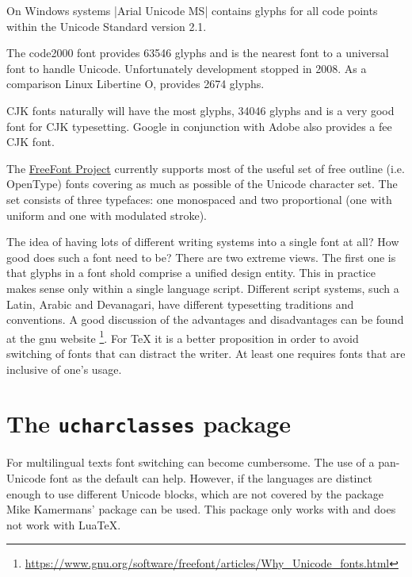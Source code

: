 On Windows systems |Arial Unicode MS| contains glyphs for all code points within the Unicode Standard version 2.1.  

The code2000 font provides 63546 glyphs and is the nearest font to a universal font to handle Unicode. Unfortunately development stopped in 2008. As a comparison Linux Libertine O, provides 2674 glyphs. \label{code2000}

CJK fonts naturally will have the most glyphs,  34046 glyphs and is a very good font for CJK typesetting. Google in conjunction with Adobe also provides a fee CJK font.

The \href{http://ftp.gnu.org/gnu/freefont/}{FreeFont Project} currently supports most of the useful set of free outline (i.e. OpenType) fonts covering as much as possible of the Unicode character set. The set consists of three typefaces: one monospaced and two proportional (one with uniform and one with modulated stroke). 

The idea of having lots of different writing systems into a single font at all? How good does such a font need to be?
There are two extreme views.  The first one is that glyphs in a font shold comprise a unified design entity. This in practice makes sense only within a single language script. Different script systems, such a Latin, Arabic and Devanagari, have different typesetting traditions and conventions.  A good discussion of the advantages and disadvantages can be found at the gnu website \footnote{\protect\url{https://www.gnu.org/software/freefont/articles/Why_Unicode_fonts.html}}. For TeX it is a better proposition in order to avoid switching of fonts that can distract the writer. At least one requires fonts that are inclusive of one's usage. 

\section{The \texttt{ucharclasses} package}

For multilingual texts font switching can become cumbersome. The use of a pan-Unicode font as the default can help. However, if the languages are distinct enough to use different Unicode blocks, which are not covered by the  package Mike Kamermans' package  can be used. This package only works with \xelatex and does not work with LuaTeX. 

